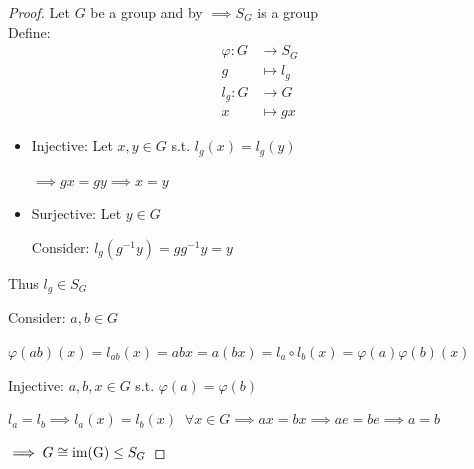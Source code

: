 \begin{proof}
    Let $G$ be a group and by  $\implies S_G$ is a group\\

    Define:
    \begin{align*}
        \varphi: G &\rightarrow S_G\\
        g &\mapsto l_g\\
        l_g : G &\rightarrow G\\
        x &\mapsto gx
    \end{align*}

    \begin{itemize}
        \item Injective: Let $x,y \in G$ s.t. $l_g(x)=l_g(y)$
        
        $\implies gx=gy \implies x=y$

        \item Surjective: Let $y \in G$
        
        Consider: $l_g(g^{-1}y)=gg^{-1}y=y$
    \end{itemize}

    Thus $l_g \in S_G$

    Consider: $a,b \in G$

    $\varphi(ab)(x)=l_{ab}(x)=abx=a(bx)=l_a\circ l_b(x)=\varphi(a)\varphi(b)(x)$

    Injective: $a,b,x \in G$ s.t. $\varphi(a)=\varphi(b)$

    $l_a=l_b \implies l_a(x)=l_b(x)\;\; \forall x \in G \implies ax=bx \implies ae=be \implies a=b$

    $\implies G \cong \text{im(G)} \leq S_G$
\end{proof}
\newpage
{}
